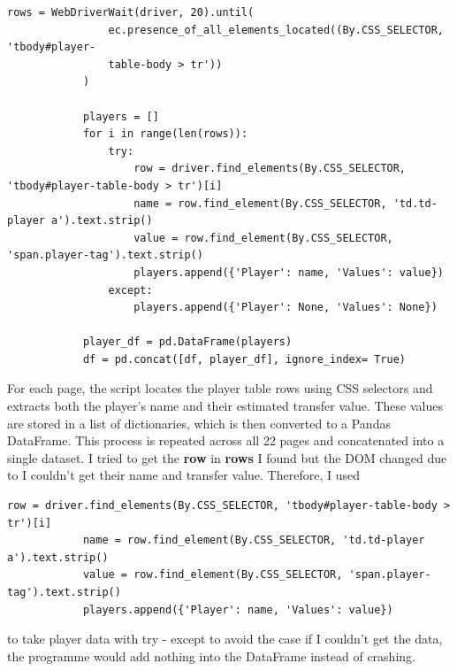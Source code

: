 \documentclass[a4paper,12pt]{article}
\begin{document}
\begin{itemize}[label= {*}, leftmargin= 1cm]
\begin{itemize}[label= {}, leftmargin= 1cm]
        \begin{Verbatim}[fontsize=\footnotesize, xleftmargin= -2cm]
            rows = WebDriverWait(driver, 20).until(
                ec.presence_of_all_elements_located((By.CSS_SELECTOR, 'tbody#player-
                table-body > tr'))
            )

            players = []
            for i in range(len(rows)):
                try:
                    row = driver.find_elements(By.CSS_SELECTOR, 'tbody#player-table-body > tr')[i]
                    name = row.find_element(By.CSS_SELECTOR, 'td.td-player a').text.strip()
                    value = row.find_element(By.CSS_SELECTOR, 'span.player-tag').text.strip()
                    players.append({'Player': name, 'Values': value})
                except:
                    players.append({'Player': None, 'Values': None})
                    
            player_df = pd.DataFrame(players)
            df = pd.concat([df, player_df], ignore_index= True)
        \end{Verbatim}
        \vspace{0.3cm}
        
        For each page, the script locates the player table rows using CSS selectors and extracts both the player's name and their estimated transfer value. These values are stored in a list of dictionaries, which is then converted to a Pandas DataFrame. This process is repeated across all 22 pages and concatenated into a single dataset. I tried to get the \textbf{row} in \textbf{rows} I found but the DOM changed due to I couldn't get their name and transfer value. Therefore, I used 
        \vspace{0.3cm}

        \begin{Verbatim}[fontsize=\footnotesize, xleftmargin= -2cm]
            row = driver.find_elements(By.CSS_SELECTOR, 'tbody#player-table-body > tr')[i]
            name = row.find_element(By.CSS_SELECTOR, 'td.td-player a').text.strip()
            value = row.find_element(By.CSS_SELECTOR, 'span.player-tag').text.strip()
            players.append({'Player': name, 'Values': value})
        \end{Verbatim}
        \vspace{0.3cm}
        
        to take player data with try - except to avoid the case if I couldn't get the data, the programme would add nothing into the DataFrame instead of crashing.
        \vspace{0.3cm}


\end{itemize}
\end{itemize}
\end{document}
